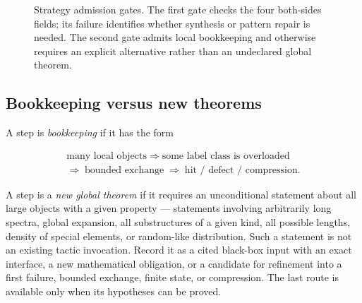 \documentclass[
  11pt,
]{article}
\theoremstyle{definition}
\begin{document}
\begin{figure}[htbp]
{%
}
\caption[Strategy admission gates]{Strategy admission gates.  The first gate checks the four both-sides fields; its failure identifies whether synthesis or pattern repair is needed.  The second gate admits local bookkeeping and otherwise requires an explicit alternative rather than an undeclared global theorem.}
\label{fig:strategy-admission-gates}
\end{figure}

\subsection{Bookkeeping versus new
theorems}\label{bookkeeping-versus-new-theorems}

A step is \emph{bookkeeping} if it has the form

\[
\begin{gathered}
\text{many local objects}
\;\Rightarrow\;
\text{some label class is overloaded}\\
\Rightarrow\;
\text{bounded exchange}
\;\Rightarrow\;
\text{hit / defect / compression}.
\end{gathered}
\]

A step is a \emph{new global theorem} if it requires an unconditional
statement about all large objects with a given property --- statements
involving arbitrarily long spectra, global expansion, all substructures
of a given kind, all possible lengths, density of special elements, or
random-like distribution. Such a statement is not an existing tactic
invocation. Record it as a cited black-box input with an exact interface,
a new mathematical obligation, or a candidate for refinement into a
first failure, bounded exchange, finite state, or compression. The last
route is available only when its hypotheses can be proved.
\end{document}
